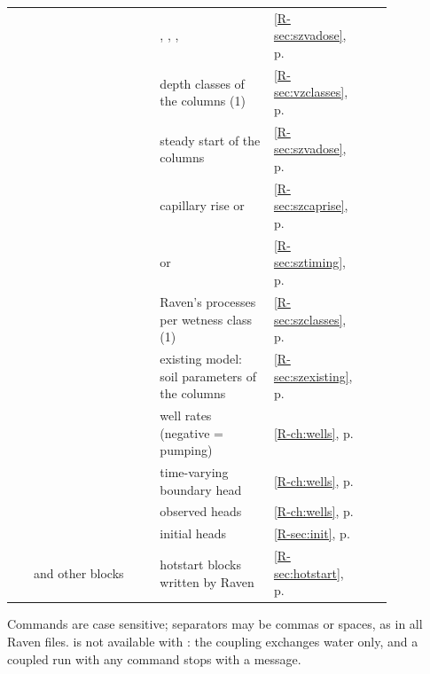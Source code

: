 \begin{longtable}{P{0.05\linewidth}P{0.31\linewidth}P{0.29\linewidth}P{0.14\linewidth}P{0.06\linewidth}}
 &  & , , ,  & \ref{R-sec:szvadose}, p.\,\pageref{R-sec:szvadose} & \pageref{R-cmd:SoilZoneVadose}\\
 &  & depth classes of the columns (1) & \ref{R-sec:vzclasses}, p.\,\pageref{R-sec:vzclasses} & \pageref{R-cmd:SoilZoneVadoseClasses}\\
 &  & steady start of the columns & \ref{R-sec:szvadose}, p.\,\pageref{R-sec:szvadose} & \pageref{R-cmd:SoilZoneVadoseInitialFlux}\\
 &  & capillary rise  or  & \ref{R-sec:szcaprise}, p.\,\pageref{R-sec:szcaprise} & \pageref{R-cmd:SoilZoneCapillaryRise}\\
 &  &  or  & \ref{R-sec:sztiming}, p.\,\pageref{R-sec:sztiming} & \pageref{R-cmd:SoilZoneExchangeTiming}\\
 &  & Raven's processes per wetness class (1) & \ref{R-sec:szclasses}, p.\,\pageref{R-sec:szclasses} & \pageref{R-cmd:SoilZoneClasses}\\
 &  & existing model: soil parameters of the columns & \ref{R-sec:szexisting}, p.\,\pageref{R-sec:szexisting} & \pageref{R-cmd:SoilZoneAquiferClass}\\
 &  & well rates (negative = pumping) & \ref{R-ch:wells}, p.\,\pageref{R-ch:wells} & \pageref{R-cmd:WellFlowRate}\\
 &  & time-varying boundary head & \ref{R-ch:wells}, p.\,\pageref{R-ch:wells} & \pageref{R-cmd:BoundaryHead}\\
 &  & observed heads & \ref{R-ch:wells}, p.\,\pageref{R-ch:wells} & \pageref{R-cmd:ObservationData}\\
 &  & initial heads & \ref{R-sec:init}, p.\,\pageref{R-sec:init} & \pageref{R-cmd:InitialGWHeads}\\
 &  and other  blocks & hotstart blocks written by Raven & \ref{R-sec:hotstart}, p.\,\pageref{R-sec:hotstart} & \pageref{R-cmd:Hotstart}\\\bottomrule
\end{longtable}
\endgroup
Commands are case sensitive; separators may be commas or spaces, as in all Raven files.  is not available
with : the coupling exchanges water only, and a coupled run with any 
command stops with a message.
